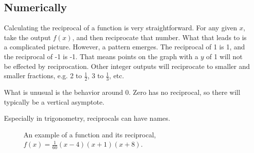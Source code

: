 
\subsection{Numerically}


Calculating the reciprocal of a function is very straightforward.  For any given $x$,
take the output $f(x)$, and then reciprocate that number.  What that leads to is a
complicated picture.  However, a pattern emerges.  The reciprocal of 1 is 1, and the
reciprocal of -1 is -1.  That means points on the graph with a $y$ of 1 will not
be effected by reciprocation.  Other integer outputs will reciprocate to smaller and
smaller fractions, e.g. 2 to $\frac{1}{2}$, 3 to $\frac{1}{3}$, etc.

What is unusual is the behavior around 0.  Zero has no reciprocal, so there will 
typically be a vertical asymptote.

Especially in trigonometry, reciprocals can have names.

\begin{figure}
\begin{centering}
\caption[Example of graphical reciprocation]{An example of a function and its reciprocal, $f(x)=\frac{1}{60}(x-4)(x+1)(x+8)$.}
\end{centering}
\end{figure}